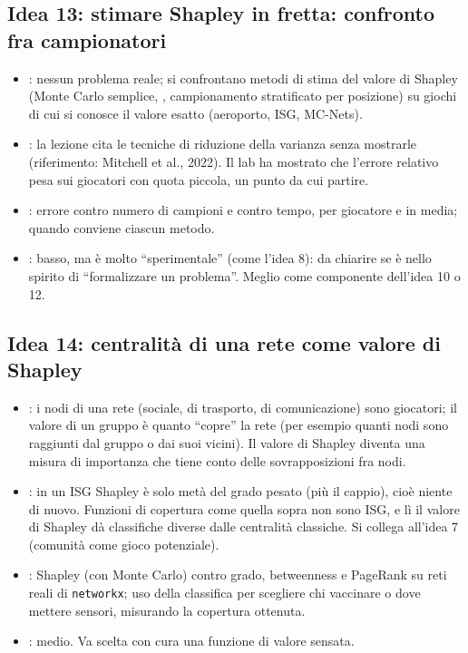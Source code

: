 \documentclass[11pt, a4paper, oneside, openany]{book}
\newcommand{\stato}[2]{\etichetta{#1}{#2}}
\newcommand{\sbloccata}[1]{\stato{blu}{DA LEZIONE #1}}
\begin{document}
\subsection*{Idea 13: stimare Shapley in fretta: confronto fra campionatori \hfill\sbloccata{6}}
\begin{itemize}
  \item {}: nessun problema reale; si confrontano metodi di stima del valore di
        Shapley (Monte Carlo semplice, , campionamento
        stratificato per posizione) su giochi di cui si conosce il valore esatto
        (aeroporto, ISG, MC-Nets).
  \item {}: la lezione cita le tecniche di riduzione della varianza
        senza mostrarle (riferimento: Mitchell et al., 2022). Il lab ha mostrato che
        l'errore relativo pesa sui giocatori con quota piccola, un punto da cui partire.
  \item {}: errore contro numero di campioni e contro tempo, per giocatore e
        in media; quando conviene ciascun metodo.
  \item {}: basso, ma è molto ``sperimentale'' (come l'idea 8): da chiarire se è
        nello spirito di ``formalizzare un problema''. Meglio come componente dell'idea 10
        o 12.
\end{itemize}

\subsection*{Idea 14: centralità di una rete come valore di Shapley \hfill\sbloccata{6}}
\begin{itemize}
  \item {}: i nodi di una rete (sociale, di trasporto, di comunicazione) sono
        giocatori; il valore di un gruppo è quanto ``copre'' la rete (per esempio quanti
        nodi sono raggiunti dal gruppo o dai suoi vicini). Il valore di Shapley diventa una
        misura di importanza che tiene conto delle sovrapposizioni fra nodi.
  \item {}: in un ISG Shapley è solo metà del grado pesato (più il
        cappio), cioè niente di nuovo. Funzioni di copertura come quella sopra non sono ISG, e lì il
        valore di Shapley dà classifiche diverse dalle centralità classiche. Si collega
        all'idea 7 (comunità come gioco potenziale).
  \item {}: Shapley (con Monte Carlo) contro grado, betweenness e PageRank su
        reti reali di \texttt{networkx}; uso della classifica per scegliere chi vaccinare o
        dove mettere sensori, misurando la copertura ottenuta.
  \item {}: medio. Va scelta con cura una funzione di valore sensata.
\end{itemize}
\end{document}
